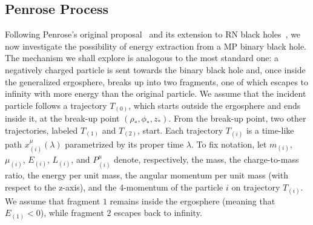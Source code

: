 \subsection{Penrose Process}

Following Penrose's original proposal~\cite{PENROSE1971} and its extension to RN black holes~\cite{RUFFINI1971,DENARDO1973}, we now investigate the possibility of energy extraction from a \ac{MP} binary black hole. The mechanism we shall explore is analogous to the most standard one: a negatively charged particle is sent towards the binary black hole and, once inside the generalized ergosphere, breaks up into two fragments, one of which escapes to infinity with more energy than the original particle. We assume that the incident particle follows a trajectory $T_{(0)}$, which starts outside the ergosphere and ends inside it, at the break-up point $(\rho_*,\phi_*,z_*)$. From the break-up point, two other trajectories, labeled $T_{(1)}$ and $T_{(2)}$, start. Each trajectory $T_{(i)}$ is a time-like path $x^{\mu}_{(i)}(\lambda)$ parametrized by its proper time $\lambda$. To fix notation, let $m_{(i)}$, $\mu_{(i)}$, $E_{(i)}$, $L_{(i)}$, and $P^{\mu}_{(i)}$ denote, respectively, the mass, the charge-to-mass ratio, the energy per unit mass, the angular momentum per unit mass (with respect to the z-axis), and the 4-momentum of the particle $i$ on trajectory $T_{(i)}$. We assume that fragment $1$ remains inside the ergosphere (meaning that $E_{(1)} < 0 $), while fragment $2$ escapes back to infinity.


